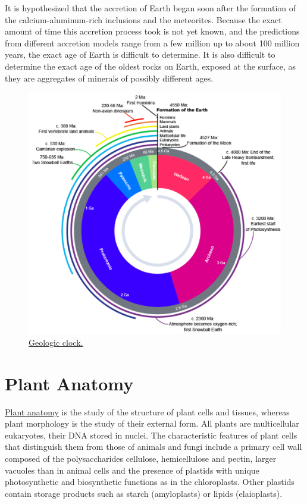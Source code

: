 It is hypothesized that the accretion of Earth began soon after the
formation of the calcium-aluminum-rich inclusions and the meteorites.
Because the exact amount of time this accretion process took is not yet
known, and the predictions from different accretion models range from a
few million up to about 100 million years, the exact age of Earth is
difficult to determine. It is also difficult to determine the exact age
of the oldest rocks on Earth, exposed at the surface, as they are
aggregates of minerals of possibly different ages.

\begin{figure}

{\centering \includegraphics[width=0.7\linewidth]{./figures/appendix1/geologic_clock}

}

\caption{\href{https://commons.wikimedia.org/wiki/File:Geologic_Clock_with_events_and_periods.svg}{Geologic
clock.}}\label{fig:clock}
\end{figure}

\section{Plant Anatomy}\label{plant-anatomy}

\href{https://en.wikipedia.org/wiki/Plant_anatomy}{Plant anatomy} is the
study of the structure of plant cells and tissues, whereas plant
morphology is the study of their external form. All plants are
multicellular eukaryotes, their DNA stored in nuclei. The characteristic
features of plant cells that distinguish them from those of animals and
fungi include a primary cell wall composed of the polysaccharides
cellulose, hemicellulose and pectin, larger vacuoles than in animal
cells and the presence of plastids with unique photosynthetic and
biosynthetic functions as in the chloroplasts. Other plastids contain
storage products such as starch (amyloplasts) or lipids (elaioplasts).

